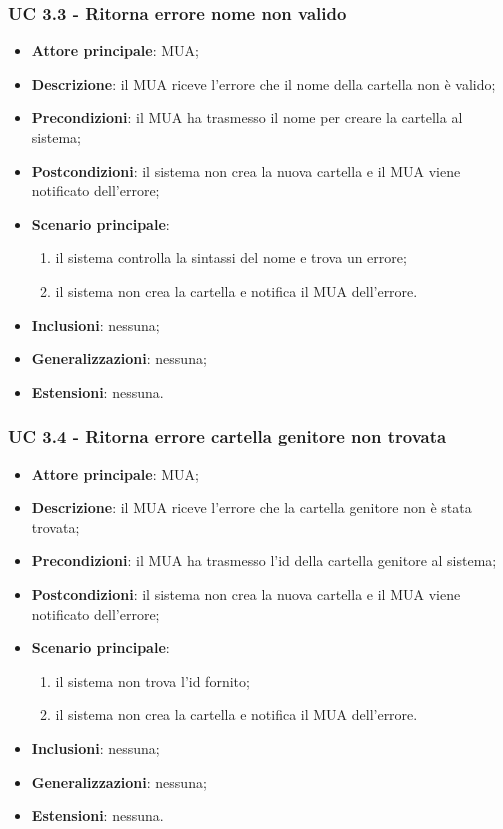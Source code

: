     \subsubsection{UC 3.3 - Ritorna errore nome non valido} \label{sec:UC3.3}
    \begin{itemize}
        \item \textbf{Attore principale}: MUA;
        \item \textbf{Descrizione}: il MUA riceve l'errore che il nome della cartella non è valido;
        \item \textbf{Precondizioni}:  il MUA ha trasmesso il nome per creare la cartella al sistema;
        \item \textbf{Postcondizioni}: il sistema non crea la nuova cartella e il MUA viene notificato dell'errore;
        \item \textbf{Scenario principale}:
            \begin{enumerate}
                \item il sistema controlla la sintassi del nome e trova un errore;
                \item il sistema non crea la cartella e notifica il MUA dell'errore.
            \end{enumerate}
        \item \textbf{Inclusioni}: nessuna;
        \item \textbf{Generalizzazioni}: nessuna;
        \item \textbf{Estensioni}: nessuna.
    \end{itemize}

    \subsubsection{UC 3.4 - Ritorna errore cartella genitore non trovata} \label{sec:UC3.4}
    \begin{itemize}
        \item \textbf{Attore principale}: MUA;
        \item \textbf{Descrizione}: il MUA riceve l'errore che la cartella genitore non è stata trovata;
        \item \textbf{Precondizioni}: il MUA ha trasmesso l'id della cartella genitore al sistema;
        \item \textbf{Postcondizioni}: il sistema non crea la nuova cartella e il MUA viene notificato dell'errore;
        \item \textbf{Scenario principale}:
            \begin{enumerate}
                \item il sistema non trova l'id fornito;
                \item il sistema non crea la cartella e notifica il MUA dell'errore.
            \end{enumerate}
        \item \textbf{Inclusioni}: nessuna;
        \item \textbf{Generalizzazioni}: nessuna;
        \item \textbf{Estensioni}: nessuna.
    \end{itemize}

